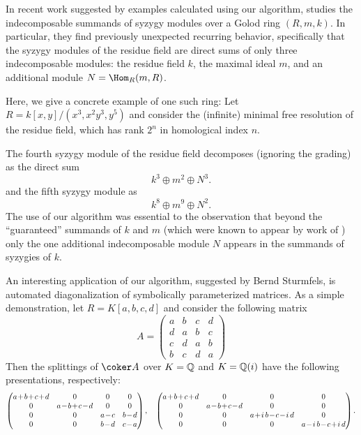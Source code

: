 \documentclass[12pt]{article}
\numberwithin{equation}{section}
\theoremstyle{theorem}
\numberwithin{thm}{section}
\theoremstyle{definition}
\begin{document}
\begin{exa}
  In recent work suggested by examples calculated using our algorithm, \cite{CDE+24} studies the indecomposable summands of syzygy modules over a Golod ring $(R,m,k)$. In particular, they find previously unexpected recurring behavior, specifically that the syzygy modules of the residue field are direct sums of only three indecomposable modules: the residue field $k$, the maximal ideal $m$, and an additional module $N = \Hom_R(m, R)$.

  Here, we give a concrete example of one such ring:
  Let $R = k[x,y]/(x^3,x^2y^3,y^5)$ and consider the (infinite) minimal free resolution of the residue field, which has rank $2^n$ in homological index $n$.

  The fourth syzygy module of the residue field decomposes (ignoring the grading) as the direct sum
  $$ k^3 \oplus m^2 \oplus N^3. $$
  and the fifth syzygy module as
  $$ k^8\oplus m^9 \oplus N^2. $$
  The use of our algorithm was essential to the observation that beyond the ``guaranteed'' summands of $k$ and $m$ (which were known to appear by work of \cite{DE23}) only the one additional indecomposable module $N$ appears in the summands of syzygies of $k$.
\end{exa}

\begin{exa}\label{example:QQ}
  An interesting application of our algorithm, suggested by Bernd Sturmfels,  is automated diagonalization of symbolically parameterized matrices. As a simple demonstration, let $R = K[a,b,c,d]$ and consider the following matrix
  \[ A = \begin{pmatrix}
    a&b&c&d\\
    d&a&b&c\\
    c&d&a&b\\
    b&c&d&a
  \end{pmatrix} \]
  Then the splittings of $\coker A$ over $K = \mathbb Q$ and $K = \mathbb Q(i)$ have the following presentations, respectively:
  \[\medmuskip1.5mu \begin{pmatrix}
    a+b+c+d&0&0&0\\
    0&a-b+c-d&0&0\\
    0&0&a-c&b-d\\
    0&0&b-d&c-a
  \end{pmatrix},
\quad
  \begin{pmatrix}
    a+b+c+d&0&0&0\\
    0&a-b+c-d&0&0\\
    0&0&a+i\,b-c-i\,d&0\\
    0&0&0&a-i\,b-c+i\,d
  \end{pmatrix}.
  \]


\end{exa}





\end{document}
